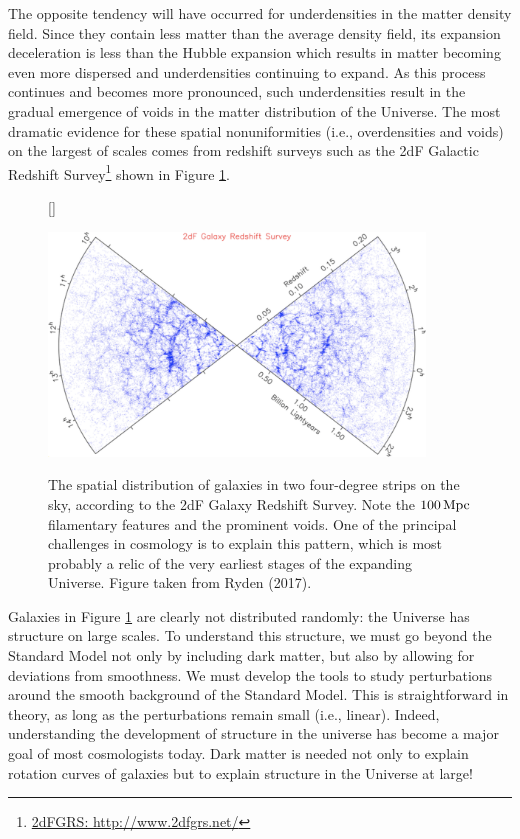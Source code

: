 \documentclass[a4paper,11pt]{article}
\begin{document}
{\noindent}The opposite tendency will have occurred for underdensities in the matter density field. Since they contain less matter than the average density field, its expansion deceleration is less than the Hubble expansion which results in matter becoming even more dispersed and underdensities continuing to expand. As this process continues and becomes more pronounced, such underdensities result in the gradual emergence of voids in the matter distribution of the Universe. The most dramatic evidence for these spatial nonuniformities (i.e., overdensities and voids) on the largest of scales comes from redshift surveys such as the 2dF Galactic Redshift Survey\footnote{\href{http://www.2dfgrs.net/}{2dFGRS: http://www.2dfgrs.net/}} shown in Figure \ref{fig:2df}.

\begin{figure}[h]
    [\FBwidth]
    {\caption{\footnotesize{The spatial distribution of galaxies in two four-degree strips on the sky, according to the 2dF Galaxy Redshift Survey. Note the $100\,{\rm Mpc}$ filamentary features and the prominent voids. One of the principal challenges in cosmology is to explain this pattern, which is most probably a relic of the very earliest stages of the expanding Universe. Figure taken from Ryden (2017).}}
    \label{fig:2df}}
    {\includegraphics[width=10cm]{figures/2df.png}}
\end{figure}

{\noindent}Galaxies in Figure \ref{fig:2df} are clearly not distributed randomly: the Universe has structure on large scales. To understand this structure, we must go beyond the Standard Model not only by including dark matter, but also by allowing for deviations from smoothness. We must develop the tools to study perturbations around the smooth background of the Standard Model. This is straightforward in theory, as long as the perturbations remain small (i.e., linear). Indeed, understanding the development of structure in the universe has become a major goal of most cosmologists today. Dark matter is needed not only to explain rotation curves of galaxies but to explain structure in the Universe at large!
\end{document}
